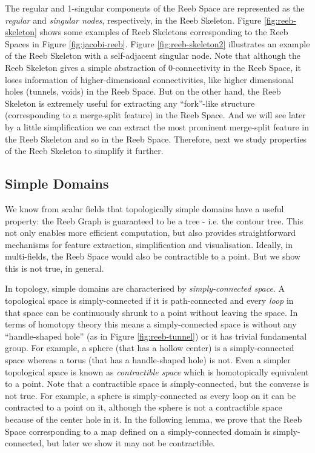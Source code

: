 \documentclass[twocolumn]{article}
\newcommand{\figref}[1]{Figure \ref{fig:#1}}
\begin{document}
\noindent
The regular and 1-singular components of
the Reeb Space are represented as the \emph{regular} and \emph{singular nodes},
respectively, in the Reeb Skeleton. \figref{reeb-skeleton} shows some
examples of Reeb Skeletons corresponding to the Reeb Spaces in \figref{jacobi-reeb}.
\figref{reeb-skeleton2} illustrates an example of the Reeb Skeleton
with a self-adjacent singular node.
Note that although the Reeb Skeleton gives a simple abstraction  of 0-connectivity in
the Reeb Space, it loses information of higher-dimensional
connectivities, like higher dimensional holes (tunnels, voids) in the
Reeb Space. But on the other hand, the Reeb Skeleton is extremely useful for
extracting any ``fork''-like structure (corresponding to a merge-split
feature)  in the Reeb Space. And we will see later
by a little simplification we can extract the most prominent merge-split
feature in the Reeb Skeleton and so in the Reeb Space.
Therefore, next we study properties of the Reeb Skeleton to simplify it
further.



\subsection{Simple Domains}
\label{sec:SimpleDomains}
We know from scalar fields that topologically simple domains have a useful property: the Reeb Graph is guaranteed 
to be a tree - i.e. the contour tree.  This not only enables more efficient computation, but also provides
straightforward mechanisms for feature extraction, simplification and
visualisation. Ideally, in multi-fields, the Reeb Space
would also be contractible to a point. But we show this is not true, in general.

In topology, simple domains are characterised by
\emph{simply-connected space}. A topological space is simply-connected
if it is path-connected and every \textit{loop} in that space can be
continuously shrunk to a point without leaving the space.
In terms of homotopy theory this means a simply-connected space is
without any ``handle-shaped hole'' (as in \figref{reeb-tunnel}) or it has trivial fundamental group.  
For example, a sphere (that has a hollow center) is a simply-connected space
whereas a torus (that has a handle-shaped hole) is not. Even a simpler
topological space is known as \emph{contractible space} which
is homotopically equivalent to a point.  Note that a contractible space is
simply-connected, but the converse is not true. For example, a sphere
is simply-connected as every loop on it can be contracted to a point on
it, although the sphere is not a contractible space because of the center
hole in it. In the following lemma, we prove that the Reeb
Space corresponding to a map defined on a simply-connected domain is
simply-connected, but later we show it may not be contractible.
\end{document}
